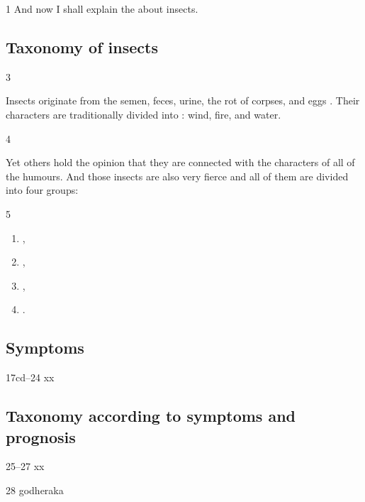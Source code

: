 \begin{translation}

\item[1]
 And now I shall explain the  about 
 insects.
 
 


\subsection{Taxonomy of insects}


\item [3] 

Insects originate from the semen, feces, urine, the rot of corpses,
and eggs .  Their
characters are traditionally divided
into : wind, fire, and water.

\item[4]

Yet others hold the opinion that they are connected with the
characters of all of the humours. And those
insects are also very fierce and all of them are divided into four
groups:

\item[5]
\begin{enumerate}
    \item {},
    \item {},
    \item {},
    \item {}.    
\end{enumerate}

\subsection{Symptoms}

\item[17cd--24] xx

\subsection{Taxonomy according to symptoms and prognosis}

\item[25--27] xx

\item [28]  \gls{godheraka}    \label{godheraka}
    

\end{translation}
